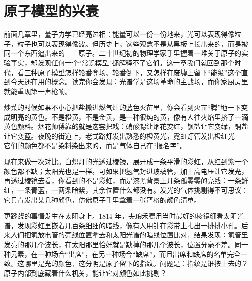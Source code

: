 \chapter{原子模型的兴衰}

前面几章里，量子力学已经亮过相：能量可以一份一份地来，光可以表现得像粒子，粒子也可以表现得像波。但历史上，这些观念不是从黑板上长出来的，而是被同一个东西逼出来的——原子。二十世纪初的物理学家手里握着一堆关于原子的实验事实，却发现任何一个“常识模型”都解释不了它们。这一章我们就回到那个时代，看三种原子模型怎样轮番登场、轮番倒下，又怎样在废墟上留下“能级”这个直到今天还在用的概念。读完你会发现：光谱学是这场革命的主战场，而你家厨房里就能重现第一声枪响。


\begin{mainline}
炒菜的时候如果不小心把盐撒进燃气灶的蓝色火苗里，你会看到火苗“腾”地一下变成明亮的黄色。不是橙黄，不是金黄，是一种很纯的黄，像有人往火焰里挤了一滴黄色颜料。烟花师傅靠的就是这套把戏：硝酸锶让烟花变红，钡盐让它变绿，铜盐让它变蓝。夜晚的街道上，老式路灯发出熟悉的橙黄光，霓虹灯管发出橙红光——它们的颜色都不是染料染出来的，而是气体自己在“报名字”。

现在来做一次对比。白炽灯的光透过棱镜，展开成一条平滑的彩虹，从红到紫一个颜色都不缺；太阳光也是一样。可如果把氢气封进玻璃管，加上高电压让它发光，再透过棱镜去看，你看到的不是彩虹，而是漆黑背景上几条孤零零的亮线：一条鲜红，一条青蓝，一两条暗紫，其余位置什么都没有。发光的气体挑剔得不可思议：它只肯发出某几种颜色，仿佛原子手里拿着一张严格的颜色清单。

更蹊跷的事情发生在太阳身上。1814 年，夫琅禾费用当时最好的棱镜细看太阳光谱，发现彩虹里嵌着几百条细细的暗线，像有人用针在彩带上扎出一排排小孔。后来人们把氢放电管的亮线位置拿去和太阳光谱的暗线位置比对，结果发现：氢管里发亮的那几个波长，在太阳那里恰好就是缺掉的那几个波长，位置分毫不差。同一种元素，在一种场合“出席”，在另一种场合“缺席”，而且出席和缺席的名单完全一致。这哪里是光的颜色，这分明是原子留下的指纹。问题是：指纹是谁按上去的？原子内部到底藏着什么机关，能让它对颜色如此挑剔？
\end{mainline}


